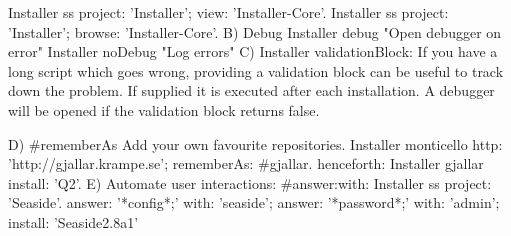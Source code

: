 \documentclass[a4paper,10pt,twoside]{book}
\begin{document}
Installer ss project: 'Installer'; view: 'Installer-Core'.
Installer ss project: 'Installer'; browse: 'Installer-Core'.
B) Debug
Installer debug "Open debugger on error"
Installer noDebug "Log errors"
C) Installer validationBlock: 
If you have a long script which goes wrong, providing a validation block can be useful to track down the problem. If supplied it is executed after each installation. A debugger will be opened if the validation block returns false.

D) #rememberAs
Add your own favourite repositories.
Installer monticello http: 'http://gjallar.krampe.se'; rememberAs: #gjallar.
henceforth:
Installer gjallar install: 'Q2'.
E) Automate user interactions: #answer:with:
Installer ss project: 'Seaside'.
answer: '*config*;' with: 'seaside';
answer: '*password*;' with: 'admin';
install: 'Seaside2.8a1'







\end{document}
